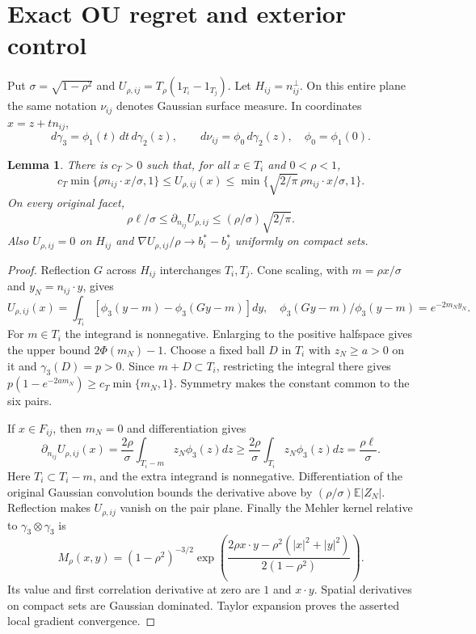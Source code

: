 \documentclass[11pt,reqno]{amsart}
\newtheorem{lemma}[theorem]{Lemma}
\theoremstyle{remark}
\newcommand{\E}{\mathbb E}
\newcommand{\ga}{\gamma}
\begin{document}
\section{Exact OU regret and exterior control}\label{sec:tails}

Put $\sigma=\sqrt{1-\rho^2}$ and
$U_{\rho,ij}=T_\rho(1_{T_i}-1_{T_j})$.
Let $H_{ij}=n_{ij}^\perp$. On this entire plane the same notation
$\nu_{ij}$ denotes Gaussian surface measure. In coordinates
$x=z+tn_{ij}$,
\[
 d\ga_3=\phi_1(t)\,dt\,d\ga_2(z),\qquad
 d\nu_{ij}=\phi_0\,d\ga_2(z),\quad \phi_0=\phi_1(0).
\]

\begin{lemma}\label{lem:margin}
There is $c_T>0$ such that, for all $x\in T_i$ and $0<\rho<1$,
\begin{equation}\label{eq:saturated-margin}
 c_T\min\{\rho n_{ij}\cdot x/\sigma,1\}
 \le U_{\rho,ij}(x)
 \le\min\{\sqrt{2/\pi}\,\rho n_{ij}\cdot x/\sigma,1\}.
\end{equation}
On every original facet,
\begin{equation}\label{eq:facet-gradient}
 \rho\ell/\sigma\le\partial_{n_{ij}}U_{\rho,ij}
             \le(\rho/\sigma)\sqrt{2/\pi}.
\end{equation}
Also $U_{\rho,ij}=0$ on $H_{ij}$ and
$\nabla U_{\rho,ij}/\rho\to b_i^*-b_j^*$ uniformly on compact sets.
\end{lemma}

\begin{proof}
Reflection $G$ across $H_{ij}$ interchanges $T_i,T_j$. Cone scaling,
with $m=\rho x/\sigma$ and $y_N=n_{ij}\cdot y$, gives
\[
 U_{\rho,ij}(x)=\int_{T_i}[\phi_3(y-m)-\phi_3(Gy-m)]dy,
 \quad
 \phi_3(Gy-m)/\phi_3(y-m)=e^{-2m_Ny_N}.
\]
For $m\in T_i$ the integrand is nonnegative. Enlarging to the positive
halfspace gives the upper bound $2\Phi(m_N)-1$.
Choose a fixed ball $D$ in $T_i$ with $z_N\ge a>0$ on it and
$\ga_3(D)=p>0$. Since $m+D\subset T_i$, restricting the integral
there gives $p(1-e^{-2am_N})\ge c_T\min\{m_N,1\}$.
Symmetry makes the constant common to the six pairs.

If $x\in F_{ij}$, then $m_N=0$ and differentiation gives
\[
 \partial_{n_{ij}}U_{\rho,ij}(x)
 =\frac{2\rho}{\sigma}\int_{T_i-m}z_N\phi_3(z)dz
 \ge\frac{2\rho}{\sigma}\int_{T_i}z_N\phi_3(z)dz
 =\frac{\rho\ell}{\sigma}.
\]
Here $T_i\subset T_i-m$, and the extra integrand is nonnegative.
Differentiation of the original Gaussian convolution bounds the derivative
above by $(\rho/\sigma)\E|Z_N|$.
Reflection makes $U_{\rho,ij}$ vanish on the pair plane.
Finally the Mehler kernel relative to $\ga_3\otimes\ga_3$ is
\begin{equation}\label{eq:mehler}
 M_\rho(x,y)=(1-\rho^2)^{-3/2}
 \exp\left(\frac{2\rho x\cdot y-\rho^2(|x|^2+|y|^2)}{2(1-\rho^2)}\right).
\end{equation}
Its value and first correlation derivative at zero are $1$ and $x\cdot y$.
Spatial derivatives on compact sets are Gaussian dominated. Taylor
expansion proves the asserted local gradient convergence.
\end{proof}
\end{document}
